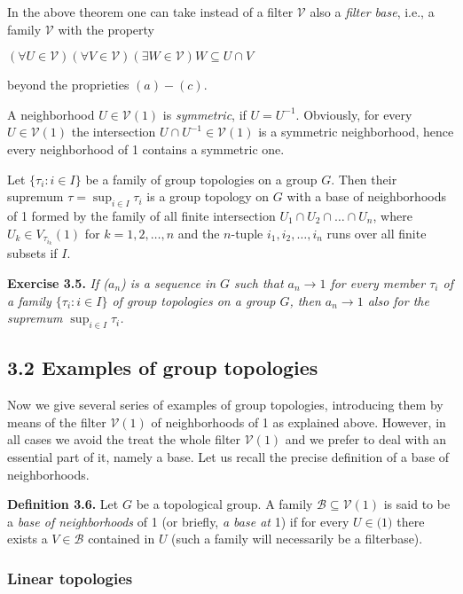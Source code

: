 \documentclass[12pt]{article}
\begin{document}
In the above theorem one can take instead of a filter $\mathcal{V}$ also a \emph{filter base}, i.e., a family $\mathcal{V}$ with the property


$(\forall U \in \mathcal{V})(\forall V \in \mathcal{V})(\exists W \in \mathcal{V})W \subseteq U \cap V$


beyond the proprieties $(a)-(c)$.


    A neighborhood $U \in \mathcal{V}(1)$ is \emph{symmetric}, if $U = U^{-1}$. Obviously, for every $U \in \mathcal{V}(1)$ the intersection
$U \cap U^{-1} \in \mathcal{V}(1)$ is a symmetric neighborhood, hence every neighborhood of 1 contains a symmetric one.


Let $\{\tau_i : i \in I\}$ be a family of group topologies on a group $G$. Then their supremum $\tau = \sup_{i \in I} \tau_i$ is a group
topology on $G$ with a base of neighborhoods of 1 formed by the family of all finite intersection $U_1 \cap U_2 \cap \dots \cap U_n$,
where $U_k \in V_{\tau_{i_k}}(1)$ for $k = 1, 2, \dots, n$ and the $n$-tuple $i_1, i_2, \dots , i_n$ runs over all finite subsets if $I$.


\textbf{Exercise 3.5.} \emph{If ($a_n$) is a sequence in $G$ such that $a_n \to 1$ for every member $\tau_i$ of a family $\{\tau_i: i \in I\}$ of group
topologies on a group $G$, then $a_n \to 1$ also for the supremum $\sup_{i \in I} \tau_i$.}


\subsection{3.2 Examples of group topologies}


    Now we give several series of examples of group topologies, introducing them by means of the filter $\mathcal{V}(1)$ of
neighborhoods of 1 as explained above. However, in all cases we avoid the treat the whole filter $\mathcal{V}(1)$ and
we prefer to deal with an essential part of it, namely a base. Let us recall the precise definition of a base of
neighborhoods.


\textbf{Definition 3.6. } Let $G$ be a topological group. A family $\mathcal{B} \subseteq \mathcal{V}(1)$ is said to be a \emph{base of neighborhoods} of 1 (or
briefly, \emph{a base at} 1) if for every $U \in \mathcal(1)$ there exists a $V \in \mathcal{B}$ contained in $U$ (such a family will necessarily be
a filterbase).


\subsubsection{Linear topologies}
\end{document}
